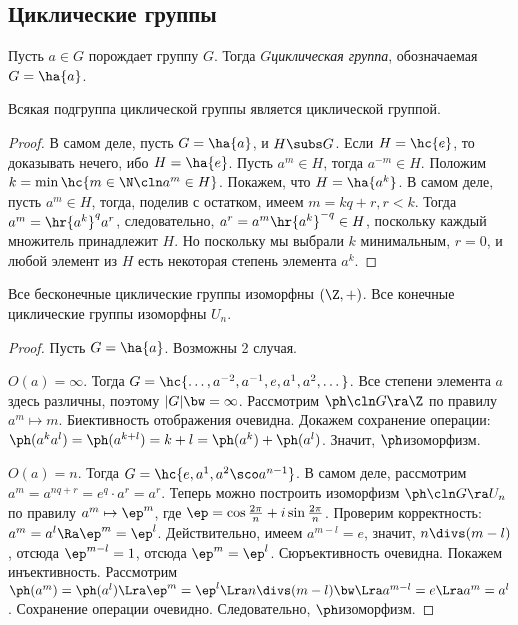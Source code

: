\documentclass[a4paper]{article}
\begin{document}
\subsection{Циклические группы}

\begin{df}
Пусть $a \in G$ порождает группу $G$. Тогда $G$\т \emph{циклическая группа}, обозначаемая $G = \ha{a}$.
\end{df}

\begin{theorem}
Всякая подгруппа циклической группы является циклической группой.
\end{theorem}
\begin{proof}
В самом деле, пусть $G= \ha{a}$, и $H \subs G$. Если $H=\hc{e}$, то доказывать нечего, ибо
$H=\ha{e}$. Пусть $a^m \in H$, тогда $a^{-m} \in H$. Положим $k=\min \hc{m \in \N\cln a^m \in H}$.
Покажем, что $H = \ha{a^k}$. В самом деле, пусть $a^m \in H$, тогда, поделив с остатком, имеем
$m = kq+r, r < k$. Тогда $a^m= \hr{a^k}^q a^r$, следовательно, $a^r=a^m \hr{a^k}^{-q} \in H$,
поскольку каждый множитель принадлежит $H$. Но поскольку мы выбрали $k$ минимальным, $r=0$, и
любой элемент из $H$ есть некоторая степень элемента $a^k$.
\end{proof}

\begin{theorem}
Все бесконечные циклические группы изоморфны $(\Z, +)$. Все конечные циклические группы изоморфны $U_n$.
\end{theorem}
\begin{proof}
Пусть $G = \ha{a}$. Возможны 2 случая.

 $O(a)=\infty$. Тогда $G = \hc{\dots, a^{-2}, a^{-1}, e, a^1, a^2, \dots}$. Все степени
элемента $a$ здесь различны, поэтому $|G| \bw= \infty$. Рассмотрим $\ph\cln G \ra \Z$ по правилу
$a^m \mapsto m$. Биективность отображения очевидна. Докажем сохранение операции:
$\ph(a^ka^l)=\ph(a^{k+l})=k+l = \ph(a^k) + \ph(a^l)$. Значит, $\ph$\т изоморфизм.

 $O(a)=n$. Тогда $G = \hc{e, a^1, a^2\sco a^{n-1}}$. В самом деле, рассмотрим
$a^m=a^{nq+r}=e^q \cdot a^r = a^r$. Теперь можно построить изоморфизм $\ph\cln G \ra U_n$ по
правилу $a^m \mapsto \ep^m$, где $\ep = \cos\frac{2\pi}{n} + i \sin\frac{2\pi}{n}$. Проверим
корректность: $a^m=a^l \Ra \ep^m=\ep^l$. Действительно, имеем $a^{m-l}=e$, значит, $n \divs (m-l)$,
отсюда $\ep^{m-l}=1$, отсюда $\ep^m=\ep^l$.
Сюръективность очевидна. Покажем инъективность. Рассмотрим
$\ph(a^m)=\ph(a^l) \Lra \ep^m=\ep^l \Lra n \divs (m-l) \bw\Lra a^{m-l}=e \Lra a^m=a^l$.
Сохранение операции очевидно. Следовательно, $\ph$\т изоморфизм.
\end{proof}
\end{document}
